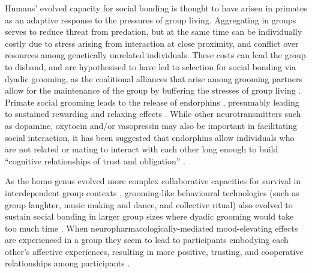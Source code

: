 \begin{CJK}{UTF8}{gbsn}

Humans' evolved capacity for social bonding is thought to have arisen in primates as an adaptive response to the pressures of group living.  Aggregating in groups serves to reduce threat from predation, but at the same time can be individually costly due to stress arising from interaction at close proximity, and conflict over resources among genetically unrelated individuals.  These costs can lead the group to disband, and are hypothesised to have led to selection for social bonding via dyadic grooming, as the coalitional alliances that arise among grooming partners allow for the maintenance of the group by buffering the stresses of group living \citep{Dunbar2012}.  Primate social grooming leads to the release of endorphins \citep[a type of endogenous opioid, see][]{Keverne1989}, presumably leading to sustained rewarding and relaxing effects \citep{Dunbar2010}.  While other neurotransmitters such as dopamine, oxytocin and/or vasopressin may also be important in facilitating social interaction, it has been suggested that endorphins allow individuals who are not related or mating to interact with each other long enough to build ``cognitive relationships of trust and obligation'' \citep[1839]{Dunbar2012}.

As the homo genus evolved more complex collaborative capacities for survival in interdependent group contexts \citep[see][]{Dunbar1998,Tomasello2012a}, grooming-like behavioural technologies (such as group laughter, music making and dance, and collective ritual) also evolved \citep[via processes of multi-level cultural group selection, see][]{Wilson2008} to sustain social bonding in larger group sizes where dyadic grooming would take too much time \citep{Dunbar2012,Tarr2014,Launay2016}. When neuropharmacologically-mediated mood-elevating effects are experienced in a group they seem to lead to participants embodying each other’s affective experiences, resulting in more positive, trusting, and cooperative relationships among participants \citep{Dunbar2012}.


\end{CJK}
